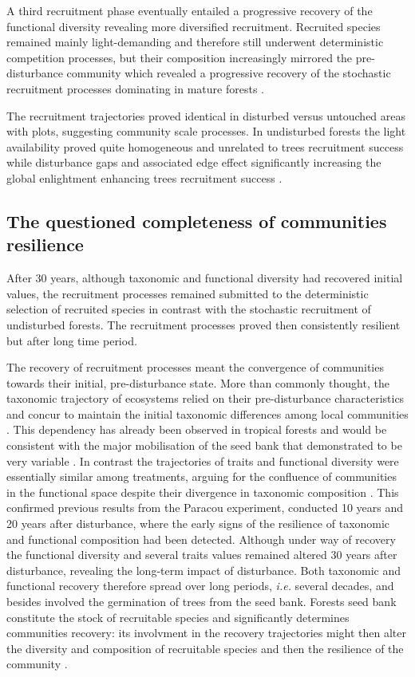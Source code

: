 \documentclass[fleqn,10pt]{ArtEcoFoG} %
\begin{document}
A third recruitment phase eventually entailed a progressive recovery of
the functional diversity revealing more diversified recruitment.
Recruited species remained mainly light-demanding and therefore still
underwent deterministic competition processes, but their composition
increasingly mirrored the pre-disturbance community which revealed a
progressive recovery of the stochastic recruitment processes dominating
in mature forests \citep{Lawton1988}.

The recruitment trajectories proved identical in disturbed versus
untouched areas with plots, suggesting community scale processes. In
undisturbed forests the light availability proved quite homogeneous and
unrelated to trees recruitment success \citep{Dalling2002} while
disturbance gaps and associated edge effect significantly increasing the
global enlightment enhancing trees recruitment success
\citep{Ruger2009}.

\subsection{The questioned completeness of communities
resilience}\label{the-questioned-completeness-of-communities-resilience}

After 30 years, although taxonomic and functional diversity had
recovered initial values, the recruitment processes remained submitted
to the deterministic selection of recruited species in contrast with the
stochastic recruitment of undisturbed forests. The recruitment processes
proved then consistently resilient but after long time period.

The recovery of recruitment processes meant the convergence of
communities towards their initial, pre-disturbance state. More than
commonly thought, the taxonomic trajectory of ecosystems relied on their
pre-disturbance characteristics and concur to maintain the initial
taxonomic differences among local communities \citep{Anderson2007}. This
dependency has already been observed in tropical forests and would be
consistent with the major mobilisation of the seed bank that
demonstrated to be very variable \citep{Dalling2002}. In contrast the
trajectories of traits and functional diversity were essentially similar
among treatments, arguing for the confluence of communities in the
functional space despite their divergence in taxonomic composition
\citep{Fukami2005}. This confirmed previous results from the Paracou
experiment, conducted 10 years \citep{Molino2001} and 20 years
\citep{Baraloto2012a} after disturbance, where the early signs of the
resilience of taxonomic and functional composition had been detected.
Although under way of recovery the functional diversity and several
traits values remained altered 30 years after disturbance, revealing the
long-term impact of disturbance. Both taxonomic and functional recovery
therefore spread over long periods, \emph{i.e.} several decades, and
besides involved the germination of trees from the seed bank. Forests
seed bank constitute the stock of recruitable species and significantly
determines communities recovery: its involvment in the recovery
trajectories might then alter the diversity and composition of
recruitable species and then the resilience of the community
\citep{Norden2009}.
\end{document}
